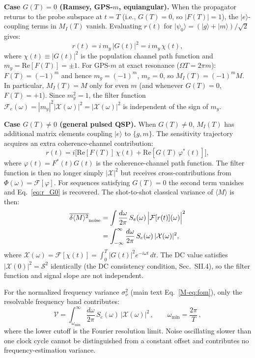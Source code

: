 \documentclass[aps,pra,twocolumn,superscriptaddress,longbibliography]{revtex4-2}
\newcommand{\be}{\begin{equation}}
\newcommand{\ee}{\end{equation}}
\begin{document}
\textbf{Case $G(T)=0$ (Ramsey, GPS-$m$, equiangular).}
When the propagator returns to the probe subspace at $t=T$ (i.e., $G(T)=0$, so
$|F(T)|=1$), the $|e\rangle$-coupling terms in $M_I(T)$ vanish.
Evaluating $r(t)$ for $|\psi_0\rangle=(|g\rangle+|m\rangle)/\sqrt{2}$ gives:
\be
  r(t) = i\,m_y\,|G(t)|^2 = i\,m_y\,\chi(t),
  \label{eq:r_G0}
\ee
where $\chi(t)\equiv|G(t)|^2$ is the population channel path function
and $m_y = \mathrm{Re}[F(T)] = \pm 1$.
For GPS-$m$ at exact resonance ($\Omega T = 2\pi m$):
$F(T)=(-1)^m$ and hence $m_y = (-1)^m$, $m_x = 0$, so $M_I(T) = (-1)^m M$.
In particular, $M_I(T) = M$ only for even $m$ (and whenever $G(T)=0$, $F(T)=+1$).
Since $m_y^2 = 1$, the filter function $\mathcal{F}_e(\omega)=|m_y|^2|\mathcal{X}(\omega)|^2=|\mathcal{X}(\omega)|^2$
is independent of the sign of $m_y$.

\textbf{Case $G(T)\neq 0$ (general pulsed QSP).}
When $G(T)\neq 0$, $M_I(T)$ has additional matrix elements coupling $|e\rangle$
to $\{g,m\}$.  The sensitivity trajectory acquires an extra coherence-channel contribution:
\be
  r(t) = i\bigl[\mathrm{Re}[F(T)]\,\chi(t)
               + \mathrm{Re}[G(T)\,\varphi^*(t)]\bigr],
  \label{eq:r_general}
\ee
where $\varphi(t)=F^*(t)G(t)$ is the coherence-channel path function.
The filter function is then no longer simply $|\mathcal{X}|^2$ but receives
cross-contributions from $\Phi(\omega)=\mathcal{F}[\varphi]$.
For sequences satisfying $G(T)=0$ the second term vanishes and Eq.~\eqref{eq:r_G0} is recovered.
The shot-to-shot classical variance of $\langle M\rangle$ is then:
\begin{align}
  \overline{\delta\langle M\rangle^2}_{\rm noise}
  &= \int\frac{d\omega}{2\pi}\,S_e(\omega)\,\Bigl|\mathcal{F}[r(t)](\omega)\Bigr|^2 \\
  &= \int_{-\infty}^{\infty}\frac{d\omega}{2\pi}\,S_e(\omega)\,|\mathcal{X}(\omega)|^2,
\end{align}
where $\mathcal{X}(\omega) = \mathcal{F}[\chi(t)] = \int_0^T|G(t)|^2 e^{-i\omega t}\,dt$.
The DC value satisfies $|\mathcal{X}(0)|^2 = \mathcal{S}^2$ identically (the DC
consistency condition, Sec.~SII.4), so the filter function and signal slope
are not independent.

For the normalized frequency variance $\sigma^2_\nu$ (main text Eq.~\eqref{M-eq:fom}),
only the resolvable frequency band contributes:
\be
  \mathcal{V} = \int_{\omega_{\min}}^{\infty}\frac{d\omega}{2\pi}\,
    S_e(\omega)\,|\mathcal{X}(\omega)|^2\,,
  \qquad \omega_{\min} = \frac{2\pi}{T}\,,
\ee
where the lower cutoff is the Fourier resolution limit.
Noise oscillating slower than one clock cycle cannot be distinguished from a
constant offset and contributes no frequency-estimation variance.
\end{document}
